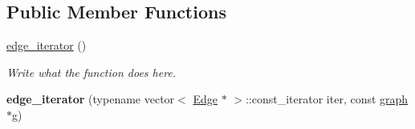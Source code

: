 \subsection*{Public Member Functions}
\begin{DoxyCompactItemize}
\item 
\hyperlink{classgraph_1_1edge__iterator_a0718227c44321df4c54ac29cd55a7bb0}{edge\+\_\+iterator} ()
\begin{DoxyCompactList}\small\item\em Write what the function does here. \end{DoxyCompactList}\item 
\hypertarget{classgraph_1_1edge__iterator_a9f8774d21a021347e94238bde191464b}{{\bfseries edge\+\_\+iterator} (typename vector$<$ \hyperlink{structgraph_1_1Edge}{Edge} $\ast$ $>$\+::const\+\_\+iterator iter, const \hyperlink{classgraph}{graph} $\ast$g)}\label{classgraph_1_1edge__iterator_a9f8774d21a021347e94238bde191464b}


\end{DoxyCompactItemize}

